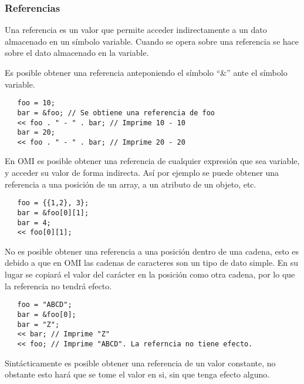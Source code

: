 

\subsubsection{Referencias}
Una referencia es un valor que permite acceder indirectamente a un dato almacenado en un símbolo variable. Cuando 
se opera sobre una referencia se hace sobre el dato almacenado en la variable.

Es posible obtener una referencia anteponiendo el símbolo ``$\&$'' ante el símbolo variable. \\

\begin{lstlisting}
   foo = 10;
   bar = &foo; // Se obtiene una referencia de foo
   << foo . " - " . bar; // Imprime 10 - 10
   bar = 20; 
   << foo . " - " . bar; // Imprime 20 - 20 
\end{lstlisting}

En OMI es posible obtener una referencia de cualquier expresión que sea variable, y acceder su valor de forma indirecta. Así por
ejemplo se puede obtener una referencia a una posición de un array, a un atributo de un objeto, etc. \\

\begin{lstlisting}
   foo = {{1,2}, 3}; 
   bar = &foo[0][1];
   bar = 4;
   << foo[0][1];
\end{lstlisting}

No es posible obtener una referencia a una posición dentro de una cadena, esto es debido a que en OMI las cadenas de caracteres son un tipo de dato simple.  
En su lugar se copiará el valor del carácter en la posición como otra cadena, por lo que la referencia no tendrá efecto. \\

\begin{lstlisting}
   foo = "ABCD"; 
   bar = &foo[0];
   bar = "Z";
   << bar; // Imprime "Z"
   << foo; // Imprime "ABCD". La referncia no tiene efecto.
\end{lstlisting}

Sintácticamente es posible obtener una referencia de un valor constante, no obstante esto hará que se tome el valor en si, sin que tenga efecto alguno.

